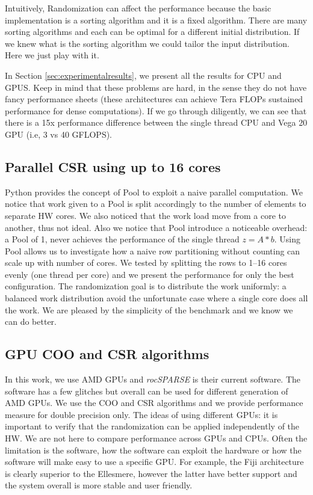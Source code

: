 \documentclass[manuscript,screen]{acmart}
\begin{document}
Intuitively, Randomization can affect the performance because the
basic implementation is a sorting algorithm and it is a fixed
algorithm. There are many sorting algorithms and each can be optimal
for a different initial distribution. If we knew what is the sorting
algorithm we could tailor the input distribution. Here we just play
with it.

In Section \ref{sec:experimentalresults}, we present all the results
for CPU and GPUS. Keep in mind that these problems are hard, in the
sense they do not have fancy performance sheets (these architectures
can achieve Tera FLOPs sustained performance for dense computations).
If we go through diligently, we can see that there is a 15x
performance difference between the single thread CPU and Vega 20 GPU
(i.e, 3 vs 40 GFLOPS).

\subsection{Parallel CSR using up to 16 cores}
\label{sec:parcpu}
Python provides the concept of Pool to exploit a naive parallel
computation. We notice that work given to a Pool is split accordingly
to the number of elements to separate HW cores. We also noticed that
the work load move from a core to another, thus not ideal. Also we
notice that Pool introduce a noticeable overhead: a Pool of 1, never
achieves the performance of the single thread $z = A*b$. Using Pool
allows us to investigate how a naive row partitioning without counting
can scale up with number of cores. We tested by splitting the rows to
1--16 cores evenly (one thread per core) and we present the
performance for only the best configuration. The randomization goal is to
distribute the work uniformly: a balanced work distribution avoid the
unfortunate case where a single core does all the work. We are pleased
by the simplicity of the benchmark and we know we can do better.



\subsection{GPU COO and CSR algorithms}
\label{sec:gpucoocsr}
In this work, we use AMD GPUs and {\em rocSPARSE} is their current
software. The software has a few glitches but overall can be used for
different generation of AMD GPUs. We use the COO and CSR algorithms
and we provide performance measure for double precision only. The
ideas of using different GPUs: it is important to verify that the
randomization can be applied independently of the HW. We are not here
to compare performance across GPUs and CPUs. Often the limitation is
the software, how the software can exploit the hardware or how the
software will make easy to use a specific GPU. For example, the Fiji
architecture is clearly superior to the Ellesmere, however the latter
have better support and the system overall is more stable and user
friendly.
\end{document}
